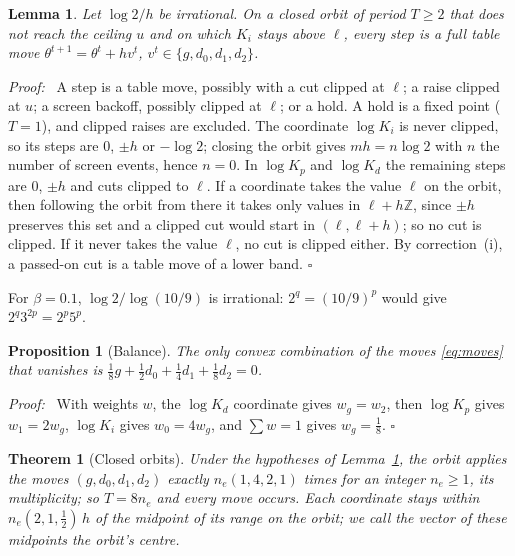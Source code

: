 \documentclass[letterpaper, 10 pt, conference]{ieeeconf}
\newtheorem{lemma}{Lemma}
\newtheorem{proposition}{Proposition}
\newtheorem{theorem}{Theorem}
\renewenvironment{proof}{\noindent\textit{Proof:}\ }{\hfill$\square$\par\smallskip}
\begin{document}
\begin{lemma}\label{lem:table}
Let $\log 2/h$ be irrational. On a closed orbit of period $T \ge 2$ that does
not reach the ceiling $u$ and on which $K_i$ stays above $\ell$, every step
is a full table move $\theta^{t+1} = \theta^t + h v^t$,
$v^t \in \{g, d_0, d_1, d_2\}$.
\end{lemma}

\begin{proof}
A step is a table move, possibly with a cut clipped at $\ell$; a raise
clipped at $u$; a screen backoff, possibly clipped at $\ell$; or a hold. A
hold is a fixed point ($T = 1$), and clipped raises are excluded. The
coordinate $\log K_i$ is never clipped, so its steps are $0$, $\pm h$ or
$-\log 2$; closing the orbit gives $m h = n \log 2$ with $n$ the number of
screen events, hence $n = 0$. In $\log K_p$ and $\log K_d$ the remaining
steps are $0$, $\pm h$ and cuts clipped to $\ell$. If a coordinate takes the
value $\ell$ on the orbit, then following the orbit from there it takes only
values in $\ell + h\mathbb{Z}$, since $\pm h$ preserves this set and a clipped
cut would start in $(\ell, \ell + h)$; so no cut is clipped. If it never
takes the value $\ell$, no cut is clipped either. By correction~(i), a
passed-on cut is a table move of a lower band.
\end{proof}

For $\beta = 0.1$, $\log 2/\log(10/9)$ is irrational: $2^q = (10/9)^p$ would
give $2^{q} 3^{2p} = 2^p 5^p$.

\begin{proposition}[Balance]\label{prop:balance}
The only convex combination of the moves \eqref{eq:moves} that vanishes is
$\tfrac18 g + \tfrac12 d_0 + \tfrac14 d_1 + \tfrac18 d_2 = 0$.
\end{proposition}

\begin{proof}
With weights $w$, the $\log K_d$ coordinate gives $w_g = w_2$, then
$\log K_p$ gives $w_1 = 2 w_g$, $\log K_i$ gives $w_0 = 4 w_g$, and
$\sum w = 1$ gives $w_g = \tfrac18$.
\end{proof}

\begin{theorem}[Closed orbits]\label{thm:orbit}
Under the hypotheses of Lemma~\ref{lem:table}, the orbit applies the moves
$(g, d_0, d_1, d_2)$ exactly $n_e (1, 4, 2, 1)$ times for an integer
$n_e \ge 1$, its \emph{multiplicity}; so $T = 8 n_e$ and every move occurs.
Each coordinate stays within $n_e (2, 1, \tfrac12)\, h$ of the midpoint of
its range on the orbit; we call the vector of these midpoints the orbit's
\emph{centre}.
\end{theorem}
\end{document}
